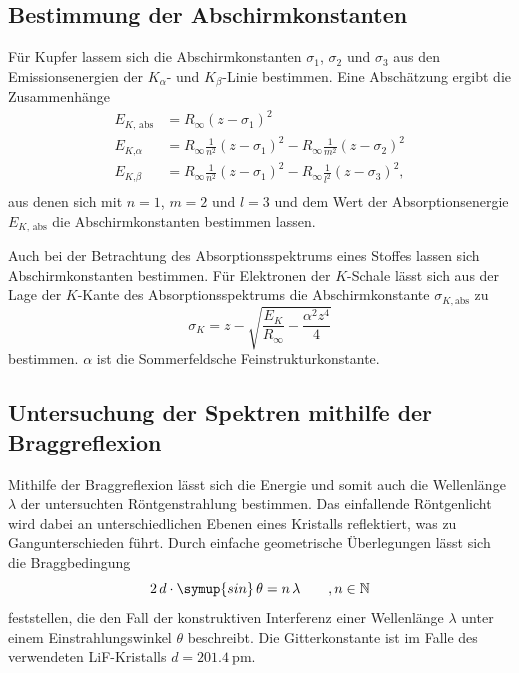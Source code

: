 \subsection{Bestimmung der Abschirmkonstanten}
\label{subsec:Abschirmkonstante}
Für Kupfer lassem sich die Abschirmkonstanten $\sigma_1$, $\sigma_2$ und $\sigma_3$ aus den Emissionsenergien der $K_\alpha$- und $K_\beta$-Linie bestimmen.
Eine Abschätzung ergibt die Zusammenhänge 
\begin{align}
    \label{eqn:Sigma_Kupfer}
    E_{K \text{, abs}} &= R_\infty (z - \sigma_1)^2 \\
    E_{K \text{,} \alpha} &= R_\infty \frac{1}{n^2} (z - \sigma_1)^2 - R_\infty \frac{1}{m^2} (z - \sigma_2)^2 \\
    E_{K \text{,} \beta} &= R_\infty \frac{1}{n^2} (z - \sigma_1)^2 - R_\infty \frac{1}{l^2} (z - \sigma_3)^2, \\
\end{align}
aus denen sich mit $n = 1$, $m = 2$ und $l = 3$ und dem Wert der Absorptionsenergie $E_{K\text{, abs}}$ die Abschirmkonstanten bestimmen lassen.

Auch bei der Betrachtung des Absorptionsspektrums eines Stoffes lassen sich Abschirmkonstanten bestimmen. 
Für Elektronen der $K$-Schale lässt sich aus der Lage der $K$-Kante des Absorptionsspektrums die Abschirmkonstante $\sigma_{K, \text{abs}}$ zu 
\begin{equation}
    \label{eqn:Sigma_K}
    \sigma_K = z - \sqrt{\frac{E_K}{R_\infty} - \frac{\alpha^2 z^4}{4}}
\end{equation}
bestimmen. $\alpha$ ist die Sommerfeldsche Feinstrukturkonstante.

\subsection{Untersuchung der Spektren mithilfe der Braggreflexion}
\label{subsec:Bragg}
Mithilfe der Braggreflexion lässt sich die Energie und somit auch die Wellenlänge $\lambda$ der untersuchten Röntgenstrahlung bestimmen. 
Das einfallende Röntgenlicht wird dabei an unterschiedlichen Ebenen eines Kristalls reflektiert, was zu Gangunterschieden führt. Durch einfache
geometrische Überlegungen lässt sich die Braggbedingung
\begin{equation}
    \label{eqn:Bragg}
    2 \, d \cdot \symup{sin} \, \theta = n \, \lambda \qquad , n \in \mathbb{N}
\end{equation}
feststellen, die den Fall der konstruktiven Interferenz einer Wellenlänge $\lambda$ unter einem Einstrahlungswinkel $\theta$ beschreibt.
Die Gitterkonstante ist im Falle des verwendeten LiF-Kristalls $d = \qty{201.4}{\pico\metre}$.
